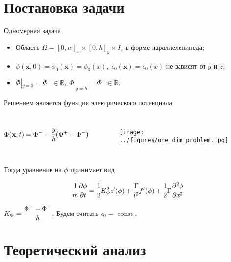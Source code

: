 \documentclass[aspectratio=169]{beamer}
\DeclareMathOperator{\Const}{const}
\newcommand*{\hm}[1]{#1\nobreak\discretionary{}
{\hbox{$\mathsurround=0pt #1$}}{}}
\begin{document}
\section{Постановка задачи}

\begin{frame}{Одномерная задача}
\vspace{-0.3cm}
\begin{itemize}
	\item Область $\Omega = [0, w]_x \times [0, h]_y \times I_z$ в форме параллелепипеда;
	\item $\phi(\textbf{x}, 0) = \phi_0(\textbf{x}) = \phi_0(x), \; \epsilon_0(\textbf{x}) =
	\epsilon_0(x)$ не зависят от $y$ и $z$;
	\item $\Phi|_{y = 0} = \Phi^- \in \mathbb{R}, \; \Phi|_{y = h} = \Phi^+ \in \mathbb{R}$.
\end{itemize}
\vspace{0.3cm}
Решением является функция электрического потенциала
\begin{columns}
\vspace{-1cm}
$$\Phi(\textbf{x}, t) = \Phi^- \hm + \cfrac{y}{h}(\Phi^+ - \Phi^-)$$
\begin{figure}
	\vspace*{-2cm}
	\hspace*{0.5cm}
	\texttt{[image: ../figures/one\_dim\_problem.jpg]}
\end{figure}
\end{columns}
\vspace{-0.4cm}
Тогда уравнение на $\phi$ принимает вид
\begin{block}{}
	$$\cfrac{1}{m} \cfrac{\partial \phi}{\partial t} = \cfrac{1}{2} K_\Phi^2 \epsilon'(\phi) +
	\cfrac{\Gamma}{l^2} f'(\phi) + \cfrac{1}{2} \Gamma \cfrac{\partial^2 \phi}{\partial x^2}$$
\end{block}
$K_\Phi = \cfrac{\Phi^+ - \Phi^-}{h}$. Будем считать $\epsilon_0 = \Const$.
\end{frame}


\section{Теоретический анализ}
\end{document}
